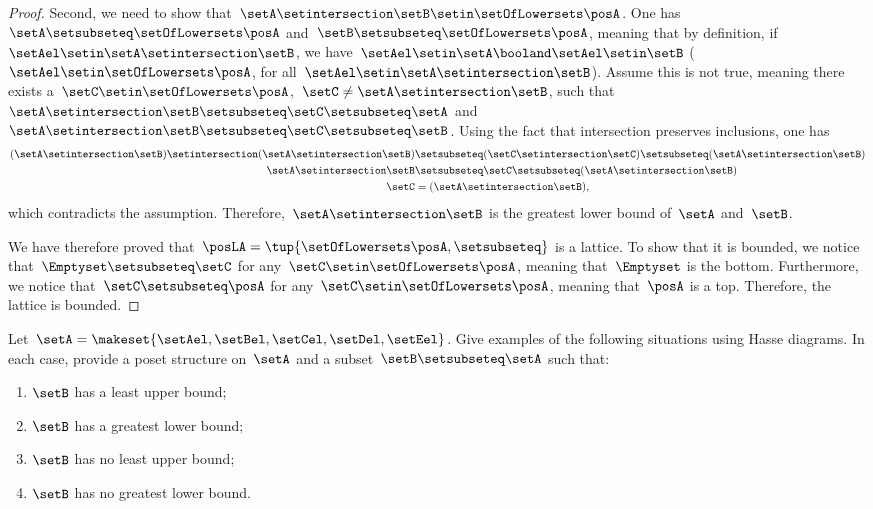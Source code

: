 \begin{proof}
    Second, we need to show that~$\setA \setintersection \setB\setin \setOfLowersets \posA$.
    One has~$\setA \setsubseteq \setOfLowersets \posA$ and~$\setB\setsubseteq \setOfLowersets \posA$, meaning that by definition, if~$\setAel\setin \setA\setintersection \setB$, we have~$\setAel \setin \setA\booland \setAel\setin \setB$ ($\setAel\setin \setOfLowersets \posA$, for all~$\setAel\setin \setA \setintersection \setB$).
    Assume this is not true, meaning there exists a~$\setC\setin \setOfLowersets \posA$,~$\setC\neq \setA\setintersection \setB$, such that~$\setA\setintersection \setB\setsubseteq \setC\setsubseteq \setA$ and~$\setA\setintersection \setB\setsubseteq \setC\setsubseteq \setB$.
    Using the fact that intersection preserves inclusions, one has
    \begin{equation}
        \begin{aligned}
            (\setA\setintersection \setB)
            \setintersection (\setA\setintersection \setB) & \setsubseteq (\setC \setintersection \setC) \setsubseteq (\setA\setintersection \setB) \\
            \setA\setintersection \setB                    & \setsubseteq \setC\setsubseteq (\setA\setintersection \setB) \\
            \setC                                          & =(\setA\setintersection \setB),
        \end{aligned}
    \end{equation}
    which contradicts the assumption.
    Therefore,~$\setA\setintersection \setB$ is the greatest lower bound of~$\setA$ and~$\setB$.

    We have therefore proved that~$\posLA=\tup{\setOfLowersets \posA,\setsubseteq}$ is a lattice.
    To show that it is bounded, we notice that~$\Emptyset \setsubseteq \setC$ for any~$\setC\setin \setOfLowersets \posA$, meaning that~$\Emptyset$ is the bottom.
    Furthermore, we notice that~$\setC\setsubseteq \posA$ for any~$\setC\setin \setOfLowersets \posA$, meaning that~$\posA$ is a top.
    Therefore, the lattice is bounded.
\end{proof}

\vfill

\begin{gradedexercise}
    \label{ex:UpperLowerBounds}
    Let~$\setA = \makeset{\setAel, \setBel, \setCel, \setDel, \setEel }$.
    Give examples of the following situations using Hasse diagrams.
    In each case, provide a poset structure on~$\setA$ and a subset~$\setB \setsubseteq \setA$ such that:
    \begin{enumerate}
        \item $\setB$ has a least upper bound;
        \item $\setB$ has a greatest lower bound;
        \item $\setB$ has no least upper bound;
        \item $\setB$ has no greatest lower bound.
    \end{enumerate}
\end{gradedexercise}

